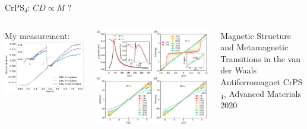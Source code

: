 \begin{frame}{CrPS$_4$: $CD \propto M$ ?}
	\begin{columns}
		My measurement:\\
		\centering
		\includegraphics{../figures/2023-12-14 CrPS4 circular dichroism.pdf}
	
		\centering
		\includegraphics[width=\textwidth]{image14.png}
		\\\vspace{1cm}\raggedright\small
		Magnetic Structure and Metamagnetic Transitions in the van der Waals
		Antiferromagnet CrPS$_4$, Advanced Materials 2020

	\end{columns}
	
\end{frame}


